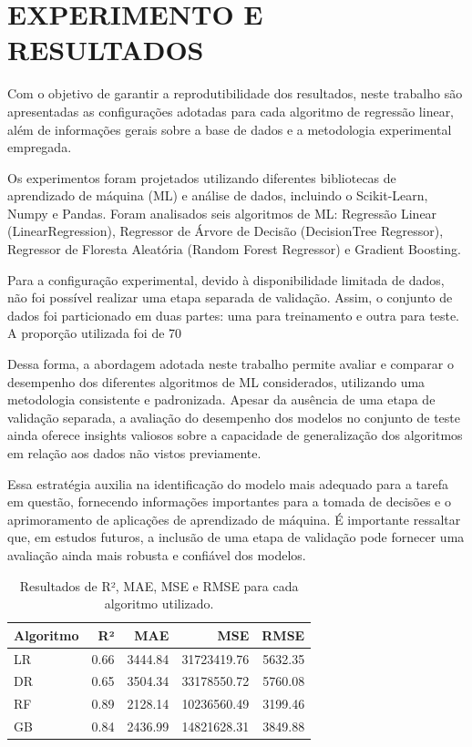 \documentclass[conference]{IEEEtran}
\begin{document}
\section{EXPERIMENTO E RESULTADOS}

Com o objetivo de garantir a reprodutibilidade dos resultados, neste trabalho são apresentadas as configurações adotadas para cada algoritmo de regressão linear, além de informações gerais sobre a base de dados e a metodologia experimental empregada.

Os experimentos foram projetados utilizando diferentes bibliotecas de aprendizado de máquina (ML) e análise de dados, incluindo o Scikit-Learn, Numpy e Pandas. Foram analisados seis algoritmos de ML: Regressão Linear (LinearRegression), Regressor de Árvore de Decisão (DecisionTree Regressor), Regressor de Floresta Aleatória (Random Forest Regressor) e Gradient Boosting.

Para a configuração experimental, devido à disponibilidade limitada de dados, não foi possível realizar uma etapa separada de validação. Assim, o conjunto de dados foi particionado em duas partes: uma para treinamento e outra para teste. A proporção utilizada foi de 70%

Dessa forma, a abordagem adotada neste trabalho permite avaliar e comparar o desempenho dos diferentes algoritmos de ML considerados, utilizando uma metodologia consistente e padronizada. Apesar da ausência de uma etapa de validação separada, a avaliação do desempenho dos modelos no conjunto de teste ainda oferece insights valiosos sobre a capacidade de generalização dos algoritmos em relação aos dados não vistos previamente.

Essa estratégia auxilia na identificação do modelo mais adequado para a tarefa em questão, fornecendo informações importantes para a tomada de decisões e o aprimoramento de aplicações de aprendizado de máquina. É importante ressaltar que, em estudos futuros, a inclusão de uma etapa de validação pode fornecer uma avaliação ainda mais robusta e confiável dos modelos.

\begin{table}[htbp]
  \centering
  \caption{Resultados de R², MAE, MSE e RMSE para cada algoritmo utilizado.}
    \begin{tabular}{|l|r|r|r|r|}
    \hline
    \textbf{Algoritmo}           & \textbf{R²} & \textbf{MAE} & \textbf{MSE} & \textbf{RMSE} \\ \hline
    LR                           & 0.66        & 3444.84      & 31723419.76  & 5632.35       \\ \hline
    DR                           & 0.65        & 3504.34      & 33178550.72  & 5760.08       \\ \hline
    RF                           & 0.89        & 2128.14      & 10236560.49  & 3199.46       \\ \hline
    GB                           & 0.84        & 2436.99      & 14821628.31  & 3849.88       \\ \hline
    \end{tabular}%
  \label{tab:resultados}%
\end{table}%
\end{document}
